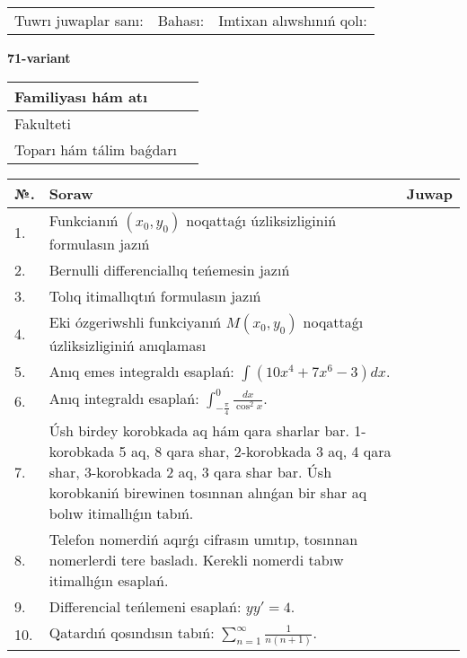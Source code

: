 \documentclass{article}
\begin{document}
\vspace{1cm}

\begin{tabular}{ c c c }
Tuwrı juwaplar sanı: \underline{\hspace{2cm}} & Bahası: \underline{\hspace{2cm}} & Imtixan alıwshınıń qolı: \underline{\hspace{2cm}} \\
\end{tabular}

\newpage

\begin{center}\textbf{71-variant}\end{center}

\bgroup
\def\arraystretch{1.5}
\begin{tabular}{ |m{6cm}|m{10cm}| }
  \hline
  Familiyası hám atı & \\
  \hline
  Fakulteti &\\
  \hline
  Toparı hám tálim baǵdarı & \\
  \hline
\end{tabular}
\egroup

\vspace{0.5cm}

\bgroup
\def\arraystretch{2}
\begin{tabular}{ |l|m{8cm}|m{7cm}| }
  \hline
  №. & Soraw & Juwap \\
  \hline
  1. & Funkcianıń $(x_{0}, y_{0})$ noqattaǵı úzliksizliginiń formulasın jazıń &  \\
  \hline
  2. & Bernulli differenciallıq teńemesin jazıń &  \\
  \hline
  3. & Tolıq itimallıqtıń formulasın jazıń &  \\
  \hline
  4. & Eki ózgeriwshli funkciyanıń $M(x_{0} , y_{0})$ noqattaǵı úzliksizliginiń anıqlaması &  \\
  \hline
  5. & Anıq emes integraldı esaplań: $\displaystyle\int \left( 10x^{4} + 7x^{6} - 3 \right)dx$. &  \\
  \hline
  6. & Anıq integraldı esaplań: $\displaystyle\int_{-\frac{\pi}{4}}^{0}\frac{dx}{\cos^{2}x}$. &  \\
  \hline
  7. & Úsh birdey korobkada aq hám qara sharlar bar. 1-korobkada 5 aq, 8 qara shar, 2-korobkada 3 aq, 4 qara shar, 3-korobkada 2 aq, 3 qara shar bar. Úsh korobkaniń birewinen tosınnan alınǵan bir shar aq bolıw itimallıǵın tabıń. &  \\
  \hline
  8. & Telefon nomerdiń aqırǵı cifrasın umıtıp, tosınnan nomerlerdi tere basladı. Kerekli nomerdi tabıw itimallıǵın esaplań. &  \\
  \hline
  9. & Differencial teńlemeni esaplań: $yy'= 4$. &  \\
  \hline
  10. & Qatardıń qosındısın tabıń: $\displaystyle\sum_{n = 1}^{\infty}\frac{1}{n(n + 1)}$. &  \\
  \hline
\end{tabular}
\egroup
\end{document}
